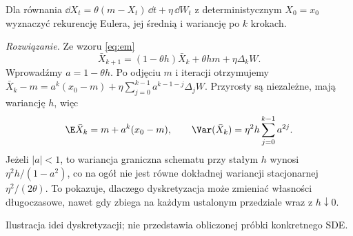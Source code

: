 \begin{zadanie}
Dla równania $\dd X_t=\theta(m-X_t)\,\dd t+\eta\,\dd W_t$
z deterministycznym $X_0=x_0$ wyznaczyć rekurencję
Eulera, jej średnią i wariancję po $k$ krokach.

\emph{Rozwiązanie.} Ze wzoru \eqref{eq:em}
\[
\bar X_{k+1}=(1-\theta h)\bar X_k+\theta hm
+\eta\Delta_kW.
\]
Wprowadźmy $a=1-\theta h$. Po odjęciu $m$
i iteracji otrzymujemy
$\bar X_k-m=a^k(x_0-m)+\eta\sum_{j=0}^{k-1}
a^{k-1-j}\Delta_jW$. Przyrosty są niezależne,
mają wariancję $h$, więc
\[
\E\bar X_k=m+a^k(x_0-m),\qquad
\Var(\bar X_k)=\eta^2h\sum_{j=0}^{k-1}a^{2j}.
\]
Jeżeli $|a|<1$, to wariancja graniczna schematu
przy stałym $h$ wynosi $\eta^2h/(1-a^2)$,
co na ogół nie jest równe dokładnej wariancji
stacjonarnej $\eta^2/(2\theta)$.
To pokazuje, dlaczego dyskretyzacja może zmieniać
własności długoczasowe, nawet gdy zbiega na każdym
ustalonym przedziale wraz z $h\downarrow0$.
\end{zadanie}

\begin{center}
\par\smallskip\small Ilustracja idei dyskretyzacji; nie przedstawia obliczonej próbki konkretnego SDE.
\end{center}

